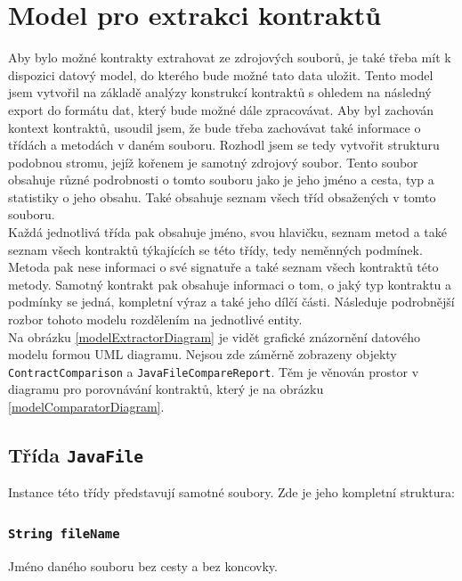 	
	\section{Model pro extrakci kontraktů}
			Aby bylo možné kontrakty extrahovat ze zdrojových souborů, je také třeba mít k dispozici datový model, do kterého bude možné tato data uložit. Tento model jsem vytvořil na základě analýzy konstrukcí kontraktů s ohledem na následný export do formátu dat, který bude možné dále zpracovávat. Aby byl zachován kontext kontraktů, usoudil jsem, že bude třeba zachovávat také informace o třídách a metodách v daném souboru. Rozhodl jsem se tedy vytvořit strukturu podobnou stromu, jejíž kořenem je samotný zdrojový soubor. Tento soubor obsahuje různé podrobnosti o tomto souboru jako je jeho jméno a cesta, typ a statistiky o jeho obsahu. Také obsahuje seznam všech tříd obsažených v tomto souboru.\\
			
			Každá jednotlivá třída pak obsahuje jméno, svou hlavičku, seznam metod a také seznam všech kontraktů týkajících se této třídy, tedy neměnných podmínek. Metoda pak nese informaci o své signatuře a také seznam všech kontraktů této metody. Samotný kontrakt pak obsahuje informaci o tom, o jaký typ kontraktu a podmínky se jedná, kompletní výraz a také jeho dílčí části. Následuje podrobnější rozbor tohoto modelu rozdělením na jednotlivé entity.\\
			
			Na obrázku \ref{modelExtractorDiagram} je vidět grafické znázornění datového modelu formou UML diagramu. Nejsou zde záměrně zobrazeny objekty \texttt{ContractComparison} a \texttt{JavaFileCompareReport}. Těm je věnován prostor v diagramu pro porovnávání kontraktů, který je na obrázku \ref{modelComparatorDiagram}. 
			
			
			\subsection{Třída \texttt{JavaFile}}
				Instance této třídy představují samotné soubory. Zde je jeho kompletní struktura:
				
				\subsubsection{\texttt{String fileName}}	
					Jméno daného souboru bez cesty a bez koncovky.
					
